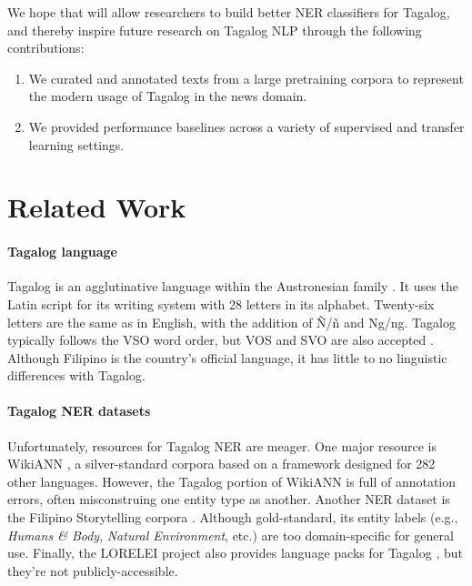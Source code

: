 \documentclass[11pt]{article}
\begin{document}
We hope that \tlunified{} will allow researchers to build better NER classifiers for Tagalog, and thereby inspire future research on Tagalog NLP through the following contributions:

\begin{enumerate}
  \item We curated and annotated texts from a large pretraining corpora to represent the modern usage of Tagalog in the news domain.
  \item We provided performance baselines across a variety of supervised and transfer learning settings.
\end{enumerate}

\section{Related Work}




\paragraph{Tagalog language}
Tagalog is an agglutinative language within the Austronesian family \cite{Kroeger1992PhraseSA}.
It uses the Latin script for its writing system with 28 letters in its alphabet.
Twenty-six letters are the same as in English, with the addition of \~{N}/\~{n} and Ng/ng.
Tagalog typically follows the VSO word order, but VOS and SVO are also accepted \citep{Schachter1973TagalogRG}.
Although Filipino is the country's official language, it has little to no linguistic differences with Tagalog.

\paragraph{Tagalog NER datasets}
Unfortunately, resources for Tagalog NER are meager.
One major resource is WikiANN \cite{Pan2017CrosslingualNT}, a silver-standard corpora based on a framework designed for 282 other languages.
However, the Tagalog portion of WikiANN is full of annotation errors, often misconstruing one entity type as another.
Another NER dataset is the Filipino Storytelling corpora \cite{Costiniano2022CustomCG}.
Although gold-standard, its entity labels (e.g., \textit{Humans \& Body}, \textit{Natural Environment}, etc.) are too domain-specific for general use.
Finally, the LORELEI project also provides language packs for Tagalog \cite{Strassel2016LORELEILP}, but they're not publicly-accessible.
\end{document}
